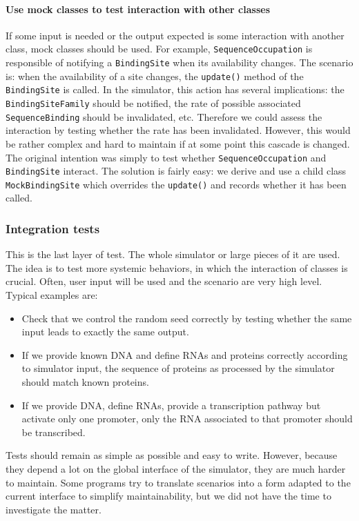 \paragraph{Use mock classes to test interaction with other classes} If some input is needed or the output expected is some interaction with another class, mock classes should be used. For example, \texttt{SequenceOccupation} is responsible of notifying a \texttt{BindingSite} when its availability changes. The scenario is: when the availability of a site changes, the \texttt{update()} method of the \texttt{BindingSite} is called. In the simulator, this action has several implications: the \texttt{BindingSiteFamily} should be notified, the rate of possible associated \texttt{SequenceBinding} should be invalidated, etc. Therefore we could assess the interaction by testing whether the rate has been invalidated. However, this would be rather complex and hard to maintain if at some point this cascade is changed. The original intention was simply to test whether \texttt{SequenceOccupation} and \texttt{BindingSite} interact. The solution is fairly easy: we derive and use a child class \texttt{MockBindingSite} which overrides the \texttt{update()} and records whether it has been called.

\subsubsection{Integration tests}

This is the last layer of test. The whole simulator or large pieces of it are used. The idea is to test more systemic behaviors, in which the interaction of classes is crucial. Often, user input will be used and the scenario are very high level. Typical examples are:
\begin{itemize}
  \item Check that we control the random seed correctly by testing whether the same input leads to exactly the same output.  
  \item If we provide known DNA and define RNAs and proteins correctly according to simulator input, the sequence of proteins as processed by the simulator should match known proteins.
  \item If we provide DNA, define RNAs, provide a transcription pathway but activate only one promoter, only the RNA associated to that promoter should be transcribed.
\end{itemize}

Tests should remain as simple as possible and easy to write. However, because they depend a lot on the global interface of the simulator, they are much harder to maintain. Some programs try to translate scenarios into a form adapted to the current interface to simplify maintainability, but we did not have the time to investigate the matter.

